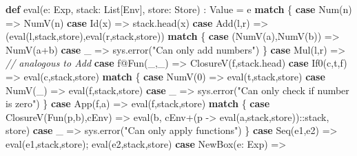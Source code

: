 \documentclass[]{article}
\newenvironment{Shaded}{}{}
\newcommand{\CommentTok}[1]{\textcolor[rgb]{0.38,0.63,0.69}{\textit{#1}}}
\newcommand{\DecValTok}[1]{\textcolor[rgb]{0.25,0.63,0.44}{#1}}
\newcommand{\FunctionTok}[1]{\textcolor[rgb]{0.02,0.16,0.49}{#1}}
\newcommand{\KeywordTok}[1]{\textcolor[rgb]{0.00,0.44,0.13}{\textbf{#1}}}
\newcommand{\NormalTok}[1]{#1}
\newcommand{\StringTok}[1]{\textcolor[rgb]{0.25,0.44,0.63}{#1}}
\begin{document}
\begin{Shaded}
\begin{Highlighting}[]
\KeywordTok{def} \FunctionTok{eval}\NormalTok{(e: Exp, stack: List[Env], store: Store) : Value = e }\KeywordTok{match}\NormalTok{ \{}
  \KeywordTok{case} \FunctionTok{Num}\NormalTok{(n) =\textgreater{} }\FunctionTok{NumV}\NormalTok{(n)}
  \KeywordTok{case} \FunctionTok{Id}\NormalTok{(x) =\textgreater{} stack.}\FunctionTok{head}\NormalTok{(x)}
  \KeywordTok{case} \FunctionTok{Add}\NormalTok{(l,r) =\textgreater{} (}\FunctionTok{eval}\NormalTok{(l,stack,store),}\FunctionTok{eval}\NormalTok{(r,stack,store)) }\KeywordTok{match}\NormalTok{ \{}
    \KeywordTok{case}\NormalTok{ (}\FunctionTok{NumV}\NormalTok{(a),}\FunctionTok{NumV}\NormalTok{(b)) =\textgreater{} }\FunctionTok{NumV}\NormalTok{(a+b)}
    \KeywordTok{case}\NormalTok{ \_ =\textgreater{} sys.}\FunctionTok{error}\NormalTok{(}\StringTok{"Can only add numbers"}\NormalTok{)}
\NormalTok{  \}}
  \KeywordTok{case} \FunctionTok{Mul}\NormalTok{(l,r) =\textgreater{} }\CommentTok{// analogous to Add}
  \KeywordTok{case}\NormalTok{ f@}\FunctionTok{Fun}\NormalTok{(\_,\_) =\textgreater{} }\FunctionTok{ClosureV}\NormalTok{(f,stack.}\FunctionTok{head}\NormalTok{)}
  \KeywordTok{case} \FunctionTok{If0}\NormalTok{(c,t,f) =\textgreater{} }\FunctionTok{eval}\NormalTok{(c,stack,store) }\KeywordTok{match}\NormalTok{ \{}
    \KeywordTok{case} \FunctionTok{NumV}\NormalTok{(}\DecValTok{0}\NormalTok{) =\textgreater{} }\FunctionTok{eval}\NormalTok{(t,stack,store)}
    \KeywordTok{case} \FunctionTok{NumV}\NormalTok{(\_) =\textgreater{} }\FunctionTok{eval}\NormalTok{(f,stack,store)}
    \KeywordTok{case}\NormalTok{ \_ =\textgreater{} sys.}\FunctionTok{error}\NormalTok{(}\StringTok{"Can only check if number is zero"}\NormalTok{)}
\NormalTok{  \}}
  \KeywordTok{case} \FunctionTok{App}\NormalTok{(f,a) =\textgreater{} }\FunctionTok{eval}\NormalTok{(f,stack,store) }\KeywordTok{match}\NormalTok{ \{}
    \KeywordTok{case} \FunctionTok{ClosureV}\NormalTok{(}\FunctionTok{Fun}\NormalTok{(p,b),cEnv) =\textgreater{}}
      \FunctionTok{eval}\NormalTok{(b, cEnv+(p {-}\textgreater{} }\FunctionTok{eval}\NormalTok{(a,stack,store))::stack, store)}
    \KeywordTok{case}\NormalTok{ \_ =\textgreater{} sys.}\FunctionTok{error}\NormalTok{(}\StringTok{"Can only apply functions"}\NormalTok{)}
\NormalTok{  \}}
  \KeywordTok{case}\NormalTok{ Seq(e1,e2) =\textgreater{} }\FunctionTok{eval}\NormalTok{(e1,stack,store); }\FunctionTok{eval}\NormalTok{(e2,stack,store)}
  \KeywordTok{case} \FunctionTok{NewBox}\NormalTok{(e: Exp) =\textgreater{}}

\end{Highlighting}
\end{Shaded}
\end{document}
